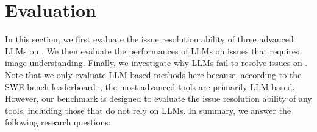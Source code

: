 










\secmargin
\section{Evaluation}

In this section, we first evaluate the issue resolution ability of three advanced LLMs on \Swebenchx. We then evaluate the performances of LLMs on issues that requires image understanding. Finally, we investigate why LLMs fail to resolve issues on \Swebenchx. %
Note that we only evaluate LLM-based methods here because, according to the SWE-bench leaderboard~\cite{swebench2024leaderboard}, the most advanced tools are primarily LLM-based. However, our benchmark is designed to evaluate the issue resolution ability of any tools, including those that do not rely on LLMs. In summary,  we answer the following research questions: 





